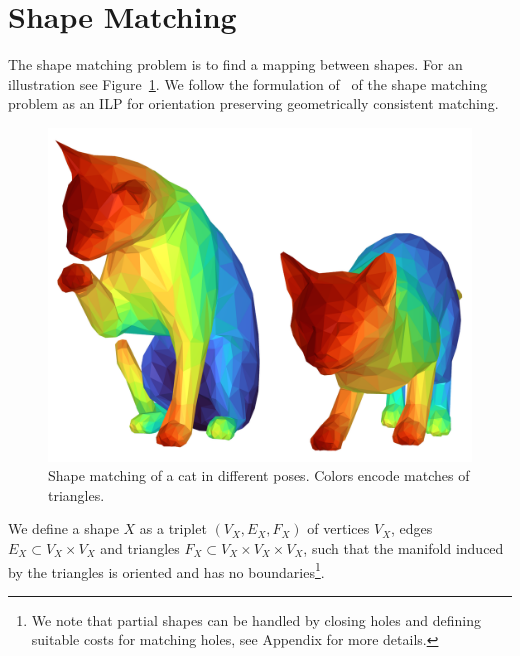 \section{Shape Matching}
\label{sec:shape-matching}
The shape matching problem is to find a mapping between shapes.
For an illustration see Figure~\ref{fig:shape-matching}.
We follow the formulation of~\cite{windheuser2011geometrically,windheuser2011large} of the shape matching problem as an ILP for orientation preserving geometrically consistent matching.

\begin{figure}[H]
\begin{center}
\includegraphics[width=0.8\columnwidth]{images/cat-matching}
\end{center}
\label{fig:shape-matching}
\caption{Shape matching of a cat in different poses. Colors encode matches of triangles.}
\end{figure}

\begin{definition}[Shape]
We define a shape $X$ as a triplet $(V_X, E_X,F_X)$ of vertices $V_X$, 
edges 
$E_X \subset V_X \times V_X$ 
and triangles 
$F_X \subset V_X \times V_X \times V_X$,
such that the manifold induced by the triangles is oriented and has no boundaries\footnote{We note that partial shapes can be handled by closing holes and defining suitable costs for matching holes, see Appendix for more details.}.
\end{definition}

